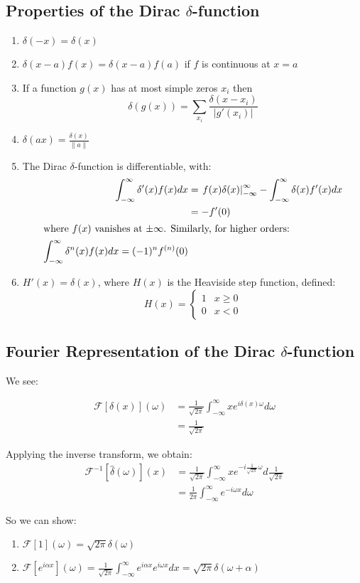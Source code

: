 \documentclass{physics_notes}
\newcommand{\intfty}{\int_{-\infty}^\infty}
\newcommand{\F}[2]{\mathcal{F}\left[#1\right](#2)}
\renewcommand{\Finv}[2]{\mathcal{F}^{-1}\left[#1\right](#2)}
\newcommand{\intF}[3]{\frac{1}{\sqrt{2\pi}}\intfty #1 e^{i#3#2}d#2}
\newcommand{\intFinv}[3]{\frac{1}{\sqrt{2\pi}}\intfty #1 e^{-i#3#2}d#3}
\begin{document}
\subsection{Properties of the Dirac $\delta$-function}
\begin{enumerate}
	\item{$\delta(-x) = \delta(x)$}
	\item{$\delta(x-a)f(x) = \delta(x-a)f(a)$ if $f$ is continuous at $x=a$}
	\item{If a function $g(x)$ has at most simple zeros $x_i$ then \begin{equation*}\delta(g(x)) = \sum_{x_i} \frac{\delta(x-x_i)}{\left|g'(x_i)\right|}\end{equation*}}
	\item{$\delta(ax) = \frac{\delta(x)}{\|a\|}$}
	\item{The Dirac $\delta$-function is differentiable, with: \begin{align*}\int_{-\infty}^\infty \delta '(x)f(x)dx &= \left. f(x)\delta(x)\right|_{-\infty}^\infty - \int_{-\infty}^\infty \delta(x) f'(x) dx \\ &= -f'(0) \\ \intertext{where $f(x)$ vanishes at $\pm\infty$. Similarly, for higher orders:} \intfty \delta^n (x)f(x)dx = (-1)^n f^{(n)}(0) \end{align*}}
	\item{$H'(x) = \delta(x)$, where $H(x)$ is the Heaviside step function, defined: \begin{equation} H(x) = \begin{cases} 1 & x\geq 0 \\ 0 & x < 0 \end{cases}\end{equation}}
\end{enumerate}
\subsection{Fourier Representation of the Dirac $\delta$-function}

We see:

\begin{align*}
\F{\delta(x)}{\omega} &= \intF{x}{\omega}{\delta(x)} \\
&= \frac{1}{\sqrt{2\pi}}
\end{align*}

Applying the inverse transform, we obtain:
\begin{align*}
\Finv{\hat{\delta}(\omega)}{x} &= \intFinv{x}{\omega}{\frac{1}{\sqrt{2\pi}}} \\
&= \frac{1}{2\pi}\intfty{e^{-i\omega x} d\omega}
\end{align*}

So we can show:
\begin{enumerate}
	\item{$\F{1}{\omega} = \sqrt{2\pi}\delta(\omega)$}
	\item{$\F{e^{i\alpha x}}{\omega} = \intF{e^{i\alpha x}}{x}{\omega} = \sqrt{2\pi}\delta(\omega + \alpha)$}
\end{enumerate}


\newpage
\printindex
\end{document}
